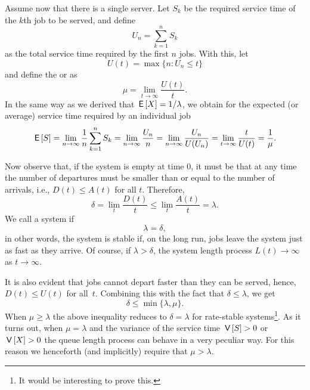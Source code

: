 Assume now that there is a single server.
Let $S_k$ be the required service time of the $k$th job to be served, and define
\begin{equation*}
U_n = \sum_{k=1}^n S_k
\end{equation*}
as the total service time required by the first $n$ jobs. With this,
let 
\begin{equation*}
  U(t) = \max\{n: U_n \leq t\}
\end{equation*}
and  define the  or  as
\begin{equation*}
  \mu = \lim_{t\to\infty} \frac{U(t)}t.
\end{equation*}
In the same way as we derived that $\,\mathsf{E}\left[X\right]= 1/\lambda$, we obtain for the expected (or average) service time required by an individual job
\begin{equation*}
  \,\mathsf{E}\left[S\right] = \lim_{n\to\infty} \frac 1 n \sum_{k=1}^n S_k = \lim_{n\to\infty} \frac{U_n}{n} = \lim_{n\to\infty} \frac{U_n}{U(U_n)} = \lim_{t\to\infty} \frac t{U(t)} = \frac 1 \mu.
\end{equation*}

Now observe that, if the system is empty at time $0$, it must be that
at any time the number of departures must be smaller than or equal to the number
of arrivals, i.e., $D(t) \leq A(t)$ for all $t$. Therefore,
\begin{equation}\label{eq:26}
\delta =   \lim_t \frac{D(t)}t \leq \lim_t \frac{A(t)}t = \lambda.
\end{equation}
We call a system  if
\begin{equation*}
  \lambda = \delta,
\end{equation*}
in other words, the system is stable if, on the long run, jobs leave
the system just as fast as they arrive. Of course, if
$\lambda > \delta$, the system length process $L(t) \to \infty$ as
$t\to \infty$.

It is also evident that jobs cannot depart faster than they can be
served, hence, $D(t) \leq U(t)$ for all~$t$. Combining this with the
fact that $\delta \leq \lambda$, we get
\begin{equation*}
  \delta \leq \min\{\lambda, \mu\}.
\end{equation*}
When $\mu \geq \lambda$ the above inequality reduces to $\delta = \lambda$ for rate-stable systems\footnote{It would be interesting to prove this.}.
As it turns out, when $\mu = \lambda$ and the variance of the service time $\,\mathsf{V}\left[S\right] > 0$ or $\,\mathsf{V}\left[X\right] >0$ the queue length process can behave in a very peculiar way.
For this reason we henceforth (and implicitly) require that $\mu > \lambda$.



